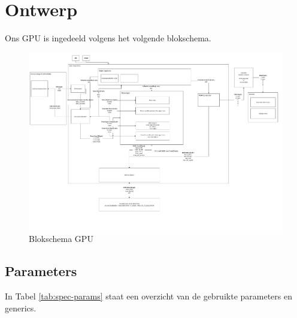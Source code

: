 \documentclass{scrreprt} %
\date{22 november 2013}
\begin{document}
\chapter{Ontwerp}
Ons GPU is ingedeeld volgens het volgende blokschema.
\begin{figure}[H]
\centering
	\includegraphics[width=\linewidth]{resources/systeemdrawing-rc.pdf}
	\caption{Blokschema GPU}
	\label{fig:Blokschema GPU}
\end{figure}

\section{Parameters}
In Tabel \ref{tab:spec-params} staat een overzicht van de gebruikte parameters en generics.
\end{document}

